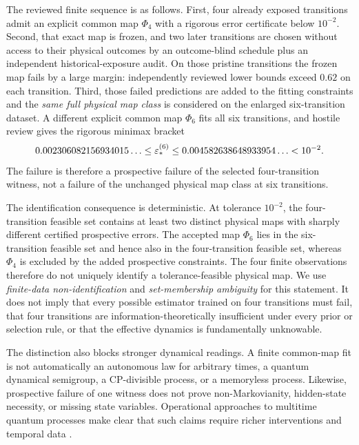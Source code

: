 The reviewed finite sequence is as follows.  First, four already exposed transitions admit an explicit common map $\Phi_4$ with a rigorous error certificate below $10^{-2}$.  Second, that exact map is frozen, and two later transitions are chosen without access to their physical outcomes by an outcome-blind schedule plus an independent historical-exposure audit.  On those pristine transitions the frozen map fails by a large margin: independently reviewed lower bounds exceed $0.62$ on each transition.  Third, those failed predictions are added to the fitting constraints and the \emph{same full physical map class} is considered on the enlarged six-transition dataset.  A different explicit common map $\Phi_6$ fits all six transitions, and hostile review gives the rigorous minimax bracket
\begin{equation}
0.002306082156934015\ldots
\le \varepsilon_*^{(6)}
\le 0.004582638648933954\ldots
<10^{-2}.
\label{eq:k6-bracket-intro}
\end{equation}
The failure is therefore a prospective failure of the selected four-transition witness, not a failure of the unchanged physical map class at six transitions.

The identification consequence is deterministic.  At tolerance $10^{-2}$, the four-transition feasible set contains at least two distinct physical maps with sharply different certified prospective errors.  The accepted map $\Phi_6$ lies in the six-transition feasible set and hence also in the four-transition feasible set, whereas $\Phi_4$ is excluded by the added prospective constraints.  The four finite observations therefore do not uniquely identify a tolerance-feasible physical map.  We use \emph{finite-data non-identification} and \emph{set-membership ambiguity} for this statement.  It does not imply that every possible estimator trained on four transitions must fail, that four transitions are information-theoretically insufficient under every prior or selection rule, or that the effective dynamics is fundamentally unknowable.

The distinction also blocks stronger dynamical readings.  A finite common-map fit is not automatically an autonomous law for arbitrary times, a quantum dynamical semigroup, a CP-divisible process, or a memoryless process.  Likewise, prospective failure of one witness does not prove non-Markovianity, hidden-state necessity, or missing state variables.  Operational approaches to multitime quantum processes make clear that such claims require richer interventions and temporal data \cite{PollockEtAl2018ProcessTensor,PollockEtAl2018Markov,WhiteEtAl2022}.

